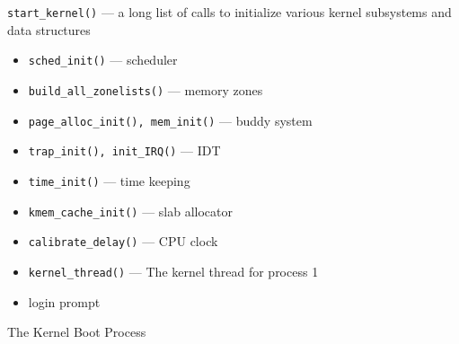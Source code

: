 \begin{frame}
  \begin{block}{\texttt{start\_kernel()} --- a long list of calls to initialize various
      kernel subsystems and data structures}
    \begin{itemize}
    \item \texttt{sched\_init()} --- scheduler
    \item \texttt{build\_all\_zonelists()} --- memory zones
    \item \texttt{page\_alloc\_init(), mem\_init()} --- buddy system
    \item \texttt{trap\_init(), init\_IRQ()} --- IDT
    \item \texttt{time\_init()} --- time keeping
    \item \texttt{kmem\_cache\_init()} --- slab allocator
    \item \texttt{calibrate\_delay()} --- CPU clock
    \item \texttt{kernel\_thread()} --- The kernel thread for process 1
    \item login prompt
    \end{itemize}
  \end{block}
\end{frame}


\begin{frame}{The Kernel Boot Process}
  \begin{center}
  \end{center}
\end{frame}

